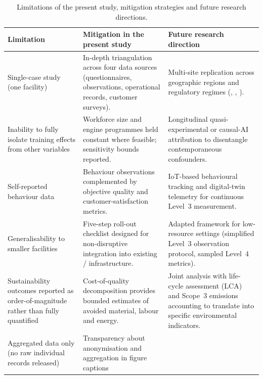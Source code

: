 \begin{table}[t]
  \centering
  \caption{Limitations of the present study, mitigation strategies and
           future research directions.}
  \label{tab:limitations}
  \small
  \begin{tabularx}{\textwidth}{@{}p{3.5cm} X X@{}}
    \toprule
    \textbf{Limitation} & \textbf{Mitigation in the present study} &
    \textbf{Future research direction} \\
    \midrule
    Single-case study (one \MRO{} facility) &
    In-depth triangulation across four data sources (questionnaires,
    observations, operational records, customer surveys). &
    Multi-site replication across geographic regions and regulatory regimes
    (\FAA{}, \EASA{}, \ANAC{}). \\
    \addlinespace
    Inability to fully isolate training effects from other variables &
    Workforce size and engine programmes held constant where feasible;
    \ROI{} sensitivity bounds reported. &
    Longitudinal quasi-experimental or causal-AI attribution
    \citep{Fernandez2024,Patel2023} to disentangle contemporaneous
    confounders. \\
    \addlinespace
    Self-reported behaviour data &
    Behaviour observations complemented by objective quality and
    customer-satisfaction metrics. &
    IoT-based behavioural tracking and digital-twin telemetry
    \citep{Garcia2024} for continuous Level~3 measurement. \\
    \addlinespace
    Generalisability to smaller \MRO{} facilities &
    Five-step roll-out checklist designed for non-disruptive integration
    into existing \LMS{}/\ERP{} infrastructure. &
    Adapted framework for low-resource settings (simplified Level~3
    observation protocol, sampled Level~4 metrics). \\
    \addlinespace
    Sustainability outcomes reported as order-of-magnitude rather than
    fully quantified &
    Cost-of-quality decomposition provides bounded estimates of avoided
    material, labour and energy. &
    Joint analysis with life-cycle assessment (LCA) and Scope~3 emissions
    accounting to translate \CoQ{} into specific environmental indicators. \\
    \addlinespace
    Aggregated data only (no raw individual records released) &
    Transparency about anonymisation and aggregation in figure captions

\end{tabularx}
\end{table}
